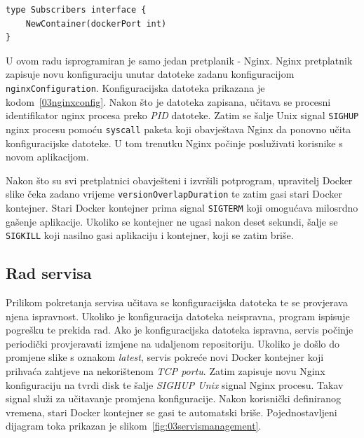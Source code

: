 \begin{lstlisting}[float=h]
type Subscribers interface {
	NewContainer(dockerPort int)
}
\end{lstlisting}

U ovom radu isprogramiran je samo jedan pretplanik - Nginx. Nginx pretplatnik zapisuje novu
konfiguraciju unutar datoteke zadanu konfiguracijom \texttt{nginxConfiguration}. Konfiguracijska
datoteka prikazana je kodom~\ref{03nginxconfig}. Nakon što je datoteka zapisana, učitava se procesni
identifikator nginx procesa preko \textit{PID} datoteke. Zatim se šalje Unix signal \texttt{SIGHUP}
nginx procesu pomoću \texttt{syscall} paketa koji obavještava Nginx da ponovno učita konfiguracijske
datoteke. U tom trenutku Nginx počinje posluživati korisnike s novom aplikacijom.

Nakon što su svi pretplatnici obavješteni i izvršili potprogram, upravitelj Docker slike čeka zadano
vrijeme \texttt{versionOverlapDuration} te zatim gasi stari Docker kontejner. Stari Docker kontejner
prima signal \texttt{SIGTERM} koji omogućava milosrdno gašenje aplikacije. Ukoliko se kontejner ne
ugasi nakon deset sekundi, šalje se \texttt{SIGKILL} koji nasilno gasi aplikaciju i kontejner, koji
se zatim briše.

\subsection{Rad servisa}
Prilikom pokretanja servisa učitava se konfiguracijska datoteka te se provjerava njena ispravnost.
Ukoliko je konfiguracija datoteka neispravna, program ispisuje pogrešku te prekida rad. Ako je
konfiguracijska datoteka ispravna, servis počinje periodički provjeravati izmjene na udaljenom
repositoriju. Ukoliko je došlo do promjene slike s oznakom \textit{latest}, servis pokreće novi
Docker kontejner koji prihvaća zahtjeve na nekorištenom \textit{TCP portu}. Zatim zapisuje novu
Nginx konfiguraciju na tvrdi disk te šalje \textit{SIGHUP Unix} signal Nginx procesu. Takav signal
služi za učitavanje promjena konfiguracije. Nakon korisnički definiranog vremena, stari Docker
kontejner se gasi te automatski briše. Pojednostavljeni dijagram toka prikazan je
slikom~\ref{fig:03servismanagement}.

